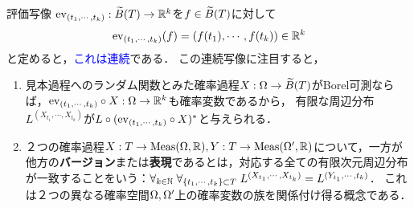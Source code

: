 \documentclass[uplatex,dvipdfmx]{jsreport}
\begin{document}
\begin{definition}
    評価写像
    $\mathrm{ev}_{(t_1,\cdots,t_k)}:\widetilde{B}(T)\to\mathbb{R}^k$を$f\in\widetilde{B}(T)$に対して
    \[\mathrm{ev}_{(t_1,\cdots,t_k)}(f)=(f(t_1),\cdots,f(t_k))\in\mathbb{R}^k\]
    と定めると，\textcolor{blue}{これは連続}である．
    この連続写像に注目すると，
    \begin{enumerate}
        \item 見本過程へのランダム関数とみた確率過程$X:\Omega\to\widetilde{B}(T)$がBorel可測ならば，$\mathrm{ev}_{(t_1,\cdots,t_k)}\circ X:\Omega\to\mathbb{R}^k$も確率変数であるから，
        有限な周辺分布$L^{(X_{t_1},\cdots,X_{t_k})}$が$L\circ(\mathrm{ev}_{(t_1,\cdots,t_k)}\circ X)^*$と与えられる．
        \item ２つの確率過程$X:T\to\mathrm{Meas}(\Omega,\mathbb{R}),Y:T\to\mathrm{Meas}(\Omega',\mathbb{R})$について，一方が他方の\textbf{バージョン}または\textbf{表現}であるとは，対応する全ての有限次元周辺分布が一致することをいう：$\forall_{k\in\mathbb{N}}\;\forall_{\{t_1,\cdots,t_k\}\subset T}\;L^{(X_{t_1},\cdots,X_{t_k})}=L^{(Y_{t_1},\cdots,t_k)}$．
        これは２つの異なる確率空間$\Omega,\Omega'$上の確率変数の族を関係付け得る概念である．
    \end{enumerate}
\end{definition}
\end{document}
